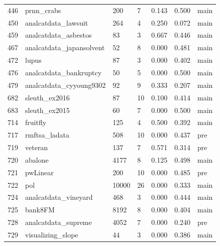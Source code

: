 \begin{table}[!htb]
\begin{tabular}{l | l | l | l | l | l | l}
446 & prnn\_crabs & 200 & 7 & 0.143 & 0.500 & main \\
450 & analcatdata\_lawsuit & 264 & 4 & 0.250 & 0.072 & main \\
459 & analcatdata\_asbestos & 83 & 3 & 0.667 & 0.446 & main \\
467 & analcatdata\_japansolvent & 52 & 8 & 0.000 & 0.481 & main \\
472 & lupus & 87 & 3 & 0.000 & 0.402 & main \\
476 & analcatdata\_bankruptcy & 50 & 5 & 0.000 & 0.500 & main \\
479 & analcatdata\_cyyoung9302 & 92 & 9 & 0.333 & 0.207 & main \\
682 & sleuth\_ex2016 & 87 & 10 & 0.100 & 0.414 & main \\
683 & sleuth\_ex2015 & 60 & 7 & 0.000 & 0.500 & main \\
714 & fruitfly & 125 & 4 & 0.500 & 0.392 & main \\
717 & rmftsa\_ladata & 508 & 10 & 0.000 & 0.437 & pre \\
719 & veteran & 137 & 7 & 0.571 & 0.314 & pre \\
720 & abalone & 4177 & 8 & 0.125 & 0.498 & main \\
721 & pwLinear & 200 & 10 & 0.000 & 0.485 & pre \\
722 & pol & 10000 & 26 & 0.000 & 0.333 & main \\
724 & analcatdata\_vineyard & 468 & 3 & 0.000 & 0.444 & main \\
725 & bank8FM & 8192 & 8 & 0.000 & 0.404 & main \\
728 & analcatdata\_supreme & 4052 & 7 & 0.000 & 0.240 & pre \\
729 & visualizing\_slope & 44 & 3 & 0.000 & 0.386 & main \\
\end{tabular}
\end{table}
